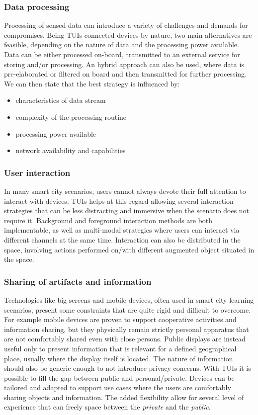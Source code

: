 \subsubsection{Data processing}
Processing of sensed data can introduce a variety of challenges and demands for compromises. Being TUIs connected devices by nature, two main alternatives are feasible, depending on the nature of data and the processing power available. Data can be either processed on-board, transmitted to an external service for storing and/or processing. An hybrid approach can also be used, where data is pre-elaborated or filtered on board and then transmitted for further processing.
We can then state that the best strategy is influenced by:
\begin{itemize}
    \item characteristics of data stream
    \item complexity of the processing routine
    \item processing power available
    \item network availability and capabilities
\end{itemize}

\subsubsection{User interaction}
In many smart city scenarios, users cannot always devote their full attention to interact with devices. TUIs helps at this regard allowing several interaction strategies that can be less distracting and immersive when the scenario does not require it.
Background and foreground interaction methods are both implementable, as well as multi-modal strategies where users can interact via different channels at the same time. Interaction can also be distributed in the space, involving actions performed on/with different augmented object situated in the space.

\subsubsection{Sharing of artifacts and information}
Technologies like big screens and mobile devices, often used in smart city learning scenarios, present some constraints that are quite rigid and difficult to overcome. For example mobile devices are proven to support cooperative activities and information sharing, but they physically remain strictly personal apparatus that are not comfortably shared even with close persons.
Public displays are instead useful only to present information that is relevant for a defined geographical place, usually where the display itself is located. The nature of information should also be generic enough to not introduce privacy concerns.
With TUIs it is possible to fill the gap between public and personal/private. Devices can be tailored and adapted to support use cases where the users are comfortably sharing objects and information.
The added flexibility allow for several level of experience that can freely space between the \textit{private} and the \textit{public}.


